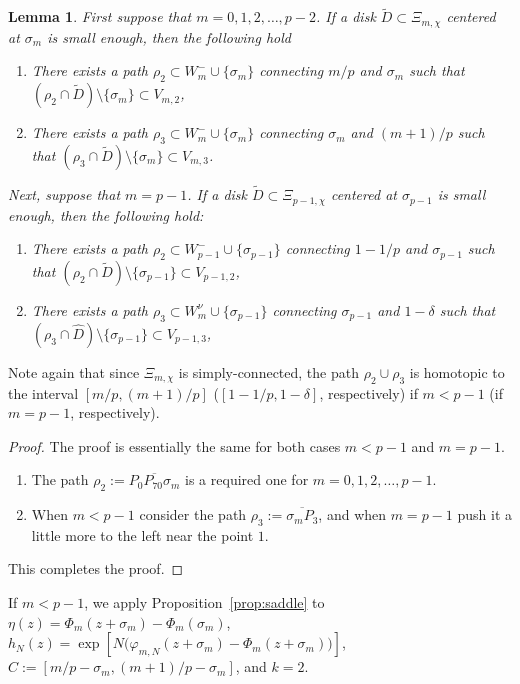 \documentclass[a4paper,dvipdfmx]{amsart}
\theoremstyle{plain}
\newtheorem{lem}[thm]{Lemma}
\theoremstyle{definition}
\theoremstyle{remark}
\newcommand{\saddle}{\sigma}
\numberwithin{equation}{section}
\begin{document}
\begin{lem}\label{lem:saddle_Phi}
First suppose that $m=0,1,2,\dots,p-2$.
If a disk $\tilde{D}\subset\Xi_{m,\chi}$ centered at $\saddle_m$ is small enough, then the following hold
\begin{enumerate}
\item
There exists a path $\rho_{2}\subset W^{-}_m\cup\{\saddle_m\}$ connecting $m/p$ and $\saddle_m$ such that $(\rho_{2}\cap\tilde{D})\setminus\{\saddle_m\}\subset V_{m,2}$,
\item
There exists a path $\rho_{3}\subset W^{-}_m\cup\{\saddle_m\}$ connecting $\saddle_m$ and $(m+1)/p$ such that $(\rho_{3}\cap\tilde{D})\setminus\{\saddle_m\}\subset V_{m,3}$.
\end{enumerate}
Next, suppose that $m=p-1$.
If a disk $\tilde{D}\subset\Xi_{p-1,\chi}$ centered at $\saddle_{p-1}$ is small enough, then the following hold:
\begin{enumerate}
\item
There exists a path $\rho_{2}\subset W^{-}_{p-1}\cup\{\saddle_{p-1}\}$ connecting $1-1/p$ and $\saddle_{p-1}$ such that $(\rho_{2}\cap\tilde{D})\setminus\{\saddle_{p-1}\}\subset V_{p-1,2}$,
\item
There exists a path $\rho_{3}\subset W^{\nu}_m\cup\{\saddle_{p-1}\}$ connecting $\saddle_{p-1}$ and $1-\delta$ such that $(\rho_{3}\cap\hat{D})\setminus\{\saddle_{p-1}\}\subset V_{p-1,3}$,
\end{enumerate}
\end{lem}
Note again that since $\Xi_{m,\chi}$ is simply-connected, the path $\rho_{2}\cup\rho_{3}$ is homotopic to the interval $[m/p,(m+1)/p]$ ($[1-1/p,1-\delta]$, respectively) if $m<p-1$ (if $m=p-1$, respectively).
\begin{proof}
The proof is essentially the same for both cases $m<p-1$ and $m=p-1$.
\begin{enumerate}
\item
The path $\rho_2:=\overline{P_0P_{70}\saddle_m}$ is a required one for $m=0,1,2,\dots,p-1$.
\item
When $m<p-1$ consider the path $\rho_3:=\overline{\saddle_m P_3}$, and when $m=p-1$ push it a little more to the left near the point $1$.
\end{enumerate}
This completes the proof.
\end{proof}
\par
If $m<p-1$, we apply Proposition~\ref{prop:saddle} to $\eta(z)=\Phi_m(z+\saddle_m)-\Phi_m(\saddle_m)$, $h_N(z)=\exp\left[N\bigl(\varphi_{m,N}(z+\saddle_m)-\Phi_{m}(z+\saddle_m)\bigr)\right]$, $C:=[m/p-\saddle_m,(m+1)/p-\saddle_m]$, and $k=2$.
\end{document}
